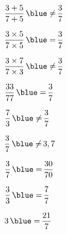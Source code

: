 \begin{colonne*exercice}
\begin{corrige}
    \begin{colenumerate}{3}
      \item $\dfrac{3+5}{7+5} \, {\blue \neq} \, \dfrac{3}{7}$ \medskip
      \item $\dfrac{3\times5}{7\times5} \, {\blue =} \, \dfrac{3}{7}$ \medskip
      \item $\dfrac{3\times7}{7\times3} \, {\blue \neq} \, \dfrac{3}{7}$ \medskip
      \item $\dfrac{33}{77} \, {\blue =} \,  \dfrac{3}{7}$
      \item $\dfrac{7}{3} \, {\blue \neq} \, \dfrac{3}{7}$
      \item $\dfrac{3}{7} \, {\blue \neq} \, 3,7$
      \item $\dfrac{3}{7} \, {\blue =} \, \dfrac{30}{70}$
      \item $\dfrac{3}{3} \, {\blue =} \, \dfrac{7}{7}$
      \item $3 \, {\blue =} \, \dfrac{21}{7}$
   \end{colenumerate}
\end{corrige}

\medskip

%



\end{colonne*exercice}
